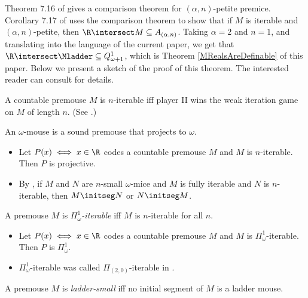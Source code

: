 \documentclass[oneside,12pt]{amsart}
\begin{document}
Theorem 7.16 of \cite{Mouse_Sets} gives a comparison theorem for
$(\alpha,n)$-petite premice.  Corollary 7.17 of \cite{Mouse_Sets} uses the comparison
theorem to show that if $M$ is iterable and $(\alpha,n)$-petite, then
$\R\intersect M \subseteq A_{(\alpha,n)}$. Taking $\alpha=2$ and $n=1$, and translating into the language of the current paper, we get that
$\R\intersect \Mladder \subseteq Q^1_{\omega+1}$, which is Theorem \ref{MRealsAreDefinable} of this paper.
Below we present a sketch of the proof of this theorem.
The interested reader can consult \cite{Mouse_Sets} for details.

\begin{definition}
A countable premouse $M$ is $n$-iterable iff
player II wins the weak iteration
game on $M$ of length $n$. (See \cite{Many_Woodins}.)
\end{definition}

\begin{definition}
An $\omega$-mouse is a sound premouse that projects to $\omega$.
\end{definition}


\begin{remarks}
\quad
\begin{itemize}
\item Let $P(x) \iff x\in\R $ codes a countable premouse $M$ and $M$ is $n$-iterable.
Then $P$ is projective.
\item By \cite{Proj_WO_In_Mod}, if $M$ and $N$ are $n$-small $\omega$-mice
and $M$ is fully iterable and $N$ is $n$-iterable, then $M\initseg N$ or $N\initseg M$.
\end{itemize}
\end{remarks}


\begin{definition}
A premouse $M$ is \emph{$\Pi^1_{\omega}$-iterable} iff $M$ is $n$-iterable for all $n$.
\end{definition}

\begin{remarks}
\quad
\begin{itemize}
\item  Let $P(x) \iff x\in\R $ codes a countable premouse $M$ and $M$ is $\Pi^1_{\omega}$-iterable.
Then $P$ is $\Pi^1_{\omega}$.
\item $\Pi^1_{\omega}$-iterable was called $\Pi_{(2,0)}$-iterable in \cite{Mouse_Sets}.
\end{itemize}
\end{remarks}

\begin{definition}
A premouse $M$ is \emph{ladder-small} iff no initial segment of $M$ is a ladder mouse.
\end{definition}
\end{document}
